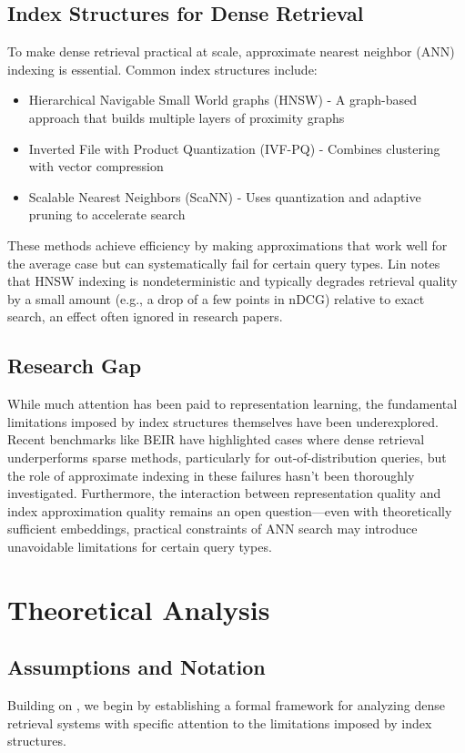 \documentclass[manuscript]{acmart}
\begin{document}
\subsection{Index Structures for Dense Retrieval}
To make dense retrieval practical at scale, approximate nearest neighbor (ANN) indexing is essential. Common index structures include:
\begin{itemize}
\item Hierarchical Navigable Small World graphs (HNSW) - A graph-based approach that builds multiple layers of proximity graphs
\item Inverted File with Product Quantization (IVF-PQ) - Combines clustering with vector compression
\item Scalable Nearest Neighbors (ScaNN) - Uses quantization and adaptive pruning to accelerate search
\end{itemize}

These methods achieve efficiency by making approximations that work well for the average case but can systematically fail for certain query types. Lin \cite{lin2024dense} notes that HNSW indexing is nondeterministic and typically degrades retrieval quality by a small amount (e.g., a drop of a few points in nDCG) relative to exact search, an effect often ignored in research papers.

\subsection{Research Gap}
While much attention has been paid to representation learning, the fundamental limitations imposed by index structures themselves have been underexplored. Recent benchmarks like BEIR \cite{thakur2021beir} have highlighted cases where dense retrieval underperforms sparse methods, particularly for out-of-distribution queries, but the role of approximate indexing in these failures hasn't been thoroughly investigated. Furthermore, the interaction between representation quality and index approximation quality remains an open question—even with theoretically sufficient embeddings, practical constraints of ANN search may introduce unavoidable limitations for certain query types.

\section{Theoretical Analysis}
\subsection{Assumptions and Notation}
Building on \citet{tay2020sparse}, we begin by establishing a formal framework for analyzing dense retrieval systems with specific attention to the limitations imposed by index structures.
\end{document}
